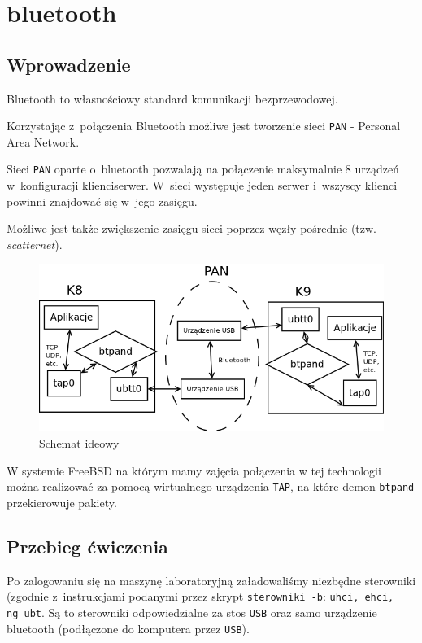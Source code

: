 \section{bluetooth}
\label{sec:bt}
\subsection{Wprowadzenie}
Bluetooth to własnościowy standard komunikacji bezprzewodowej.

Korzystając z~połączenia Bluetooth możliwe jest tworzenie sieci \texttt{PAN} - Personal Area Network.

Sieci \texttt{PAN} oparte o~bluetooth pozwalają na połączenie maksymalnie 8 urządzeń w~konfiguracji klienci\dywiz serwer\cite{wiki:pan}.
W~sieci występuje jeden serwer i~wszyscy klienci powinni znajdować się w~jego zasięgu.

Możliwe jest także zwiększenie zasięgu sieci poprzez węzły pośrednie (tzw. \emph{scatternet})\cite{bt}.
\begin{figure}[h]
  \centering
  \includegraphics[width=\textwidth]{figury/schemat-bluetooth.png}
  \caption{Schemat ideowy}
\end{figure}

W systemie FreeBSD na którym mamy zajęcia połączenia w tej technologii można realizować za pomocą wirtualnego urządzenia \texttt{TAP}, na które demon \texttt{btpand} przekierowuje pakiety.

\subsection{Przebieg ćwiczenia}
Po zalogowaniu się na maszynę laboratoryjną załadowaliśmy niezbędne sterowniki (zgodnie z~instrukcjami podanymi przez skrypt \texttt{sterowniki -b}: \texttt{uhci, ehci, ng\_ubt}.
Są to sterowniki odpowiedzialne za stos \texttt{USB} oraz samo urządzenie bluetooth (podłączone do komputera przez \texttt{USB}).

